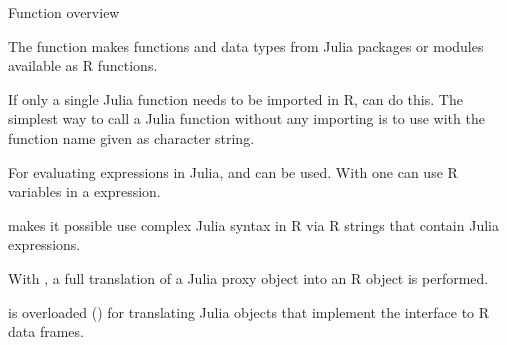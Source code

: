 \begin{Section}{Function overview}

The function  makes
functions and data types from Julia packages or modules available as R functions.

If only a single Julia function needs to be imported in R, 
can do this. The simplest way to call a Julia function without any importing
is to use  with the function name given
as character string.

For evaluating expressions in Julia,  and
 can be used. With  one can use
R variables in a expression.

 makes it possible use complex Julia syntax in R via R strings
that contain Julia expressions.

With , a full translation of a Julia proxy object into an R object
is performed.

 is overloaded ()
for translating Julia objects that implement the
 interface
to R data frames.
\end{Section}
%
